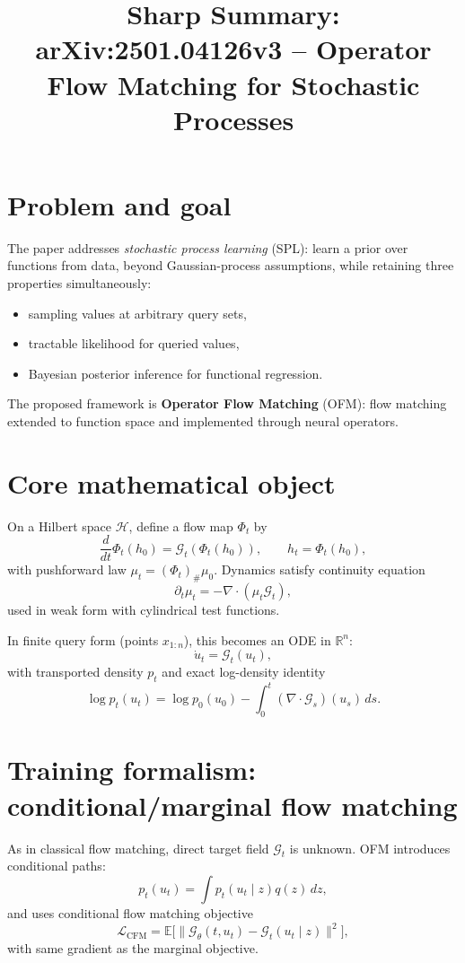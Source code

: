\documentclass[11pt]{article}
\title{Sharp Summary: arXiv:2501.04126v3 -- Operator Flow Matching for Stochastic Processes}
\author{}
\date{}
\begin{document}
\maketitle

\section*{Problem and goal}
The paper addresses \emph{stochastic process learning} (SPL): learn a prior over functions from data, beyond Gaussian-process assumptions, while retaining three properties simultaneously:
\begin{itemize}
\item sampling values at arbitrary query sets,
\item tractable likelihood for queried values,
\item Bayesian posterior inference for functional regression.
\end{itemize}

The proposed framework is \textbf{Operator Flow Matching} (OFM): flow matching extended to function space and implemented through neural operators.

\section*{Core mathematical object}
On a Hilbert space $\mathcal H$, define a flow map $\Phi_t$ by
\[
\frac{d}{dt}\Phi_t(h_0)=\mathcal G_t(\Phi_t(h_0)),\qquad h_t=\Phi_t(h_0),
\]
with pushforward law $\mu_t=(\Phi_t)_\#\mu_0$. Dynamics satisfy continuity equation
\[
\partial_t\mu_t=-\nabla\cdot(\mu_t\mathcal G_t),
\]
used in weak form with cylindrical test functions.

In finite query form (points $x_{1:n}$), this becomes an ODE in $\mathbb R^n$:
\[
\dot u_t=\mathcal G_t(u_t),
\]
with transported density $p_t$ and exact log-density identity
\[
\log p_t(u_t)=\log p_0(u_0)-\int_0^t (\nabla\cdot\mathcal G_s)(u_s)\,ds.
\]

\section*{Training formalism: conditional/marginal flow matching}
As in classical flow matching, direct target field $\mathcal G_t$ is unknown. OFM introduces conditional paths:
\[
p_t(u_t)=\int p_t(u_t\mid z)q(z)\,dz,
\]
and uses conditional flow matching objective
\[
\mathcal L_{\mathrm{CFM}}
=\mathbb E\big[\|\mathcal G_\theta(t,u_t)-\mathcal G_t(u_t\mid z)\|^2\big],
\]
with same gradient as the marginal objective.
\end{document}
